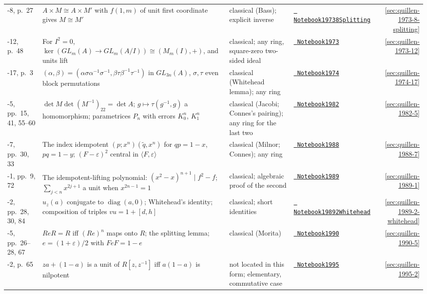 \documentclass[11pt]{article}
\newcommand{\leanblobmain}{https://github.com/Commutator-IO/grothendieck-project/blob/main/lean/Quillen}
\theoremstyle{plain}
\theoremstyle{definition}
\theoremstyle{remark}
\renewcommand{\_}{\bkunderscore\allowbreak}
\let\origtexttt\texttt
\renewcommand{\texttt}[1]{\origtexttt{\XeTeXinterchartokenstate=1 #1}}
\begin{document}
\begin{center}
{\begin{longtable}{@{}>{\raggedright\arraybackslash}p{1.6cm}>{\raggedright\arraybackslash}p{5.6cm}>{\raggedright\arraybackslash}p{3.9cm}>{\raggedright\arraybackslash}p{2.6cm}r@{}}
1973-8, p.~27 & $A \times M \cong A \times M'$ with $f(1, m)$ of unit first coordinate gives $M \cong M'$ & classical (Bass); explicit inverse & \href{\leanblobmain/Notebook1973_8Splitting.lean}{\texttt{Notebook1973\_8Splitting}} & \ref{sec:quillen-1973-8-splitting}\\
1973-12, p.~48 & For $I^2 = 0$, $\ker(GL_m(A) \to GL_m(A/I)) \cong (M_m(I), +)$, and units lift & classical; any ring, square-zero two-sided ideal & \href{\leanblobmain/Notebook1973_12.lean}{\texttt{Notebook1973\_12}} & \ref{sec:quillen-1973-12}\\
1974-17, p.~3 & $(\alpha, \beta) = (\alpha\sigma\alpha^{-1}\sigma^{-1}, \beta\tau\beta^{-1}\tau^{-1})$ in $GL_{3n}(A)$, $\sigma, \tau$ even block permutations & classical (Whitehead lemma); any ring & \href{\leanblobmain/Notebook1974_17.lean}{\texttt{Notebook1974\_17}} & \ref{sec:quillen-1974-17}\\
1982-5, pp.~15, 41, 55--60 & $\det M\det(M^{-1})_{22} = \det A$; $g \mapsto \tau(g^{-1}, g)$ a homomorphism; parametrices $P_n$ with errors $K_0^n$, $K_1^n$ & classical (Jacobi; Connes's pairing); any ring for the last two & \href{\leanblobmain/Notebook1982_5.lean}{\texttt{Notebook1982\_5}} & \ref{sec:quillen-1982-5}\\
1988-7, pp.~30, 33 & The index idempotent $(p; x^n)(\tilde q, x^n)$ for $qp = 1 - x$, $pq = 1 - y$; $(F - \varepsilon)^2$ central in $\langle F, \varepsilon\rangle$ & classical (Milnor; Connes); any ring & \href{\leanblobmain/Notebook1988_7.lean}{\texttt{Notebook1988\_7}} & \ref{sec:quillen-1988-7}\\
1989-1, pp.~9, 72 & The idempotent-lifting polynomial: $(x^2 - x)^{n+1} \mid f^2 - f$; $\sum_{j<n}x^{2j+1}$ a unit when $x^{2n-1} = 1$ & classical; algebraic proof of the second & \href{\leanblobmain/Notebook1989_1.lean}{\texttt{Notebook1989\_1}} & \ref{sec:quillen-1989-1}\\
1989-2, pp.~28, 30, 84 & $u_z(a)$ conjugate to $\operatorname{diag}(a, 0)$; Whitehead's identity; composition of triples $vu = 1 + [d, h]$ & classical; short identities & \href{\leanblobmain/Notebook1989_2Whitehead.lean}{\texttt{Notebook1989\_2Whitehead}} & \ref{sec:quillen-1989-2-whitehead}\\
1990-5, pp.~26--28, 67 & $ReR = R$ iff $(Re)^n$ maps onto $R$; the splitting lemma; $e = (1 + \varepsilon)/2$ with $FeF = 1 - e$ & classical (Morita) & \href{\leanblobmain/Notebook1990_5.lean}{\texttt{Notebook1990\_5}} & \ref{sec:quillen-1990-5}\\
1995-2, p.~65 & $za + (1 - a)$ is a unit of $R[z, z^{-1}]$ iff $a(1 - a)$ is nilpotent & not located in this form; elementary, commutative case & \href{\leanblobmain/Notebook1995_2.lean}{\texttt{Notebook1995\_2}} & \ref{sec:quillen-1995-2}\\

\end{longtable}}
\end{center}
\end{document}
